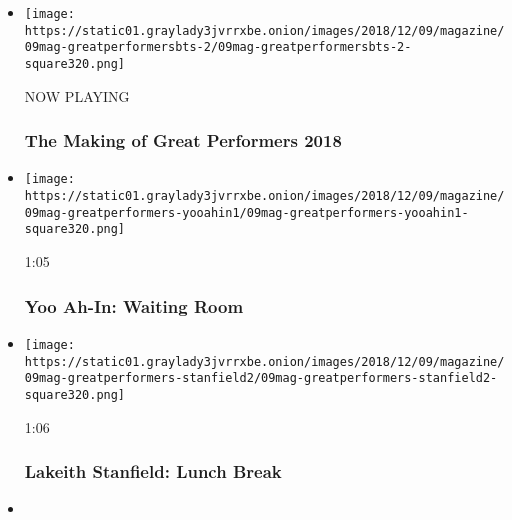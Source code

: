 \begin{itemize}
\item
  \texttt{[image: https://static01.graylady3jvrrxbe.onion/images/2018/12/09/magazine/09mag-greatperformersbts-2/09mag-greatperformersbts-2-square320.png]}

  NOW PLAYING

  \hypertarget{the-making-of-great-performers-2018-1}{%
  \subsubsection{The Making of Great Performers
  2018}\label{the-making-of-great-performers-2018-1}}
\item
  \href{https://www.nytimes3xbfgragh.onion/video/magazine/100000006246888/yoo-ah-in-waiting-room.html?action=click\&module=video-series-bar\&region=header\&pgtype=Article\&playlistId=video/great-performers}{}

  \texttt{[image: https://static01.graylady3jvrrxbe.onion/images/2018/12/09/magazine/09mag-greatperformers-yooahin1/09mag-greatperformers-yooahin1-square320.png]}

  1:05

  \hypertarget{yoo-ah-in-waiting-room}{%
  \subsubsection{Yoo Ah-In: Waiting Room}\label{yoo-ah-in-waiting-room}}
\item
  \href{https://www.nytimes3xbfgragh.onion/video/magazine/100000006246869/lakeith-stanfield-lunch-break.html?action=click\&module=video-series-bar\&region=header\&pgtype=Article\&playlistId=video/great-performers}{}

  \texttt{[image: https://static01.graylady3jvrrxbe.onion/images/2018/12/09/magazine/09mag-greatperformers-stanfield2/09mag-greatperformers-stanfield2-square320.png]}

  1:06

  \hypertarget{lakeith-stanfield-lunch-break}{%
  \subsubsection{Lakeith Stanfield: Lunch
  Break}\label{lakeith-stanfield-lunch-break}}
\item
  \href{https://www.nytimes3xbfgragh.onion/video/magazine/100000006246850/julia-roberts-the-commuter.html?action=click\&module=video-series-bar\&region=header\&pgtype=Article\&playlistId=video/great-performers}{}


\end{itemize}
